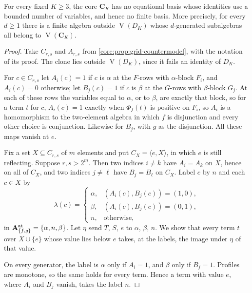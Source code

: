\begin{theorem}\label{core:thm:core-nfb}
For every fixed $K\geq3$, the core $\mathbf C_K$ has no equational basis
whose identities use a bounded number of variables, and hence no finite
basis. More precisely, for every $d\geq1$ there is a finite algebra outside
$\operatorname V(D_K)$ whose $d$-generated subalgebras all belong to
$\operatorname V(\mathbf C_K)$.
\end{theorem}
\begin{proof}
Take $C_{r,s}$ and $A_{r,s}$ from \cref{core:prop:grid-countermodel}, with
the notation of its proof. The clone lies outside $\operatorname V(D_K)$,
since it fails an identity of $D_K$.

For $c\in C_{r,s}$ let $A_i(c)=1$ if $c$ is $\alpha$ at the $F$-rows with
$\alpha$-block $F_i$, and $A_i(c)=0$ otherwise; let $B_j(c)=1$ if $c$ is
$\beta$ at the $G$-rows with $\beta$-block $G_j$. At each of these rows the
variables equal to $\alpha$, or to $\beta$, are exactly that block, so for a
term $t$ for $c$,
$A_i(c)=1$ exactly when $\Phi_f(t)$ is positive on $F_i$, so $A_i$ is a
homomorphism to the two-element algebra in which $f$ is disjunction and
every other choice is conjunction. Likewise for $B_j$, with $g$ as the
disjunction. All these maps vanish at $e$.

Fix a set $X\subseteq C_{r,s}$ of $m$ elements and put
$C_X=\langle e,X\rangle$, in which $e$ is still reflecting. Suppose
$r,s>2^m$. Then two indices $i\ne k$ have $A_i=A_k$ on $X$, hence on all of
$C_X$, and two indices $j\ne\ell$ have $B_j=B_\ell$ on $C_X$. Label $e$ by $n$ and each $c\in X$ by
\[
 \lambda(c)=
 \begin{cases}
  \alpha,&(A_i(c),B_j(c))=(1,0),\\
  \beta,&(A_i(c),B_j(c))=(0,1),\\
  n,&\text{otherwise,}
 \end{cases}
\]
in $\mathbf A^{\rm at}_{\{f,g\}}=\{\alpha,n,\beta\}$. Let $\eta$ send $T$, $S$, $e$ to $\alpha$, $\beta$,
$n$. We show that every term $t$ over $X\cup\{e\}$ whose value lies below
$e$ takes, at the labels, the image under $\eta$ of that value.

On every generator, the label is $\alpha$ only if $A_i=1$, and $\beta$ only
if $B_j=1$. Profiles are monotone, so the same holds for every term. Hence a
term with value $e$, where $A_i$ and $B_j$ vanish, takes the label $n$.


\end{proof}
